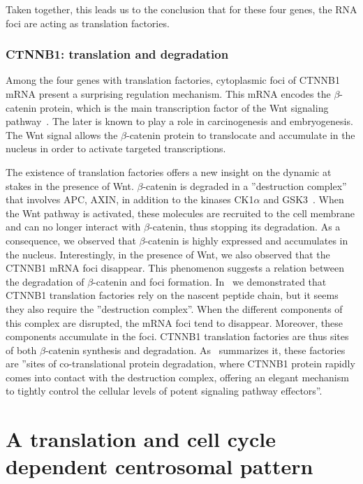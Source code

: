 Taken together, this leads us to the conclusion that for these four genes, the RNA foci are acting as translation factories.

\subsubsection{CTNNB1: translation and degradation}

Among the four genes with translation factories, cytoplasmic foci of CTNNB1 \ac{mRNA} present a surprising regulation mechanism.
This \ac{mRNA} encodes the $\beta$-catenin protein, which is the main transcription factor of the Wnt signaling pathway~\cite{Grainger_2018}.
The later is known to play a role in carcinogenesis and embryogenesis.
The Wnt signal allows the $\beta$-catenin protein to translocate and accumulate in the nucleus in order to activate targeted transcriptions.

The existence of translation factories offers a new insight on the dynamic at stakes in the presence of Wnt.
$\beta$-catenin is degraded in a ''destruction complex'' that involves APC, AXIN, in addition to the kinases CK1$\alpha$ and GSK3~\cite{stamos_catenin_2013}.
When the Wnt pathway is activated, these molecules are recruited to the cell membrane and can no longer interact with $\beta$-catenin, thus stopping its degradation.
As a consequence, we observed that $\beta$-catenin is highly expressed and accumulates in the nucleus.
Interestingly, in the presence of Wnt, we also observed that the CTNNB1 \ac{mRNA} foci disappear.
This phenomenon suggests a relation between the degradation of $\beta$-catenin and foci formation.
In~\cite{CHOUAIB_2020} we demonstrated that CTNNB1 translation factories rely on the nascent peptide chain, but it seems they also require the ''destruction complex''.
When the different components of this complex are disrupted, the \ac{mRNA} foci tend to disappear.
Moreover, these components accumulate in the foci.
CTNNB1 translation factories are thus sites of both $\beta$-catenin synthesis and degradation.
As~\cite{Chin_2020} summarizes it, these factories are ''sites of co-translational protein degradation, where CTNNB1 protein rapidly comes into contact with the destruction complex, offering an elegant mechanism to tightly control the cellular levels of potent signaling pathway effectors''.

\section{A translation and cell cycle dependent centrosomal pattern}
\label{sec:centrosomal}


